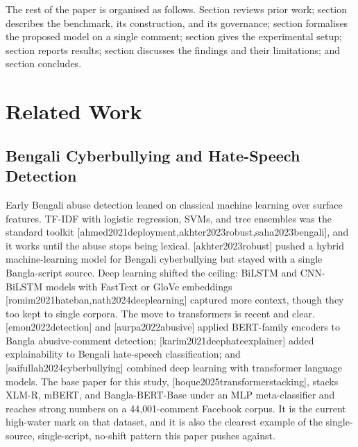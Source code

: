 \documentclass[11pt,a4paper]{article}
\def\citet#1{[#1]}%
\def\citep#1{[#1]}%
\def\Cref#1{Section}%
\def\cref#1{section}%
\begin{document}
The rest of the paper is organised as follows. \Cref{sec:related-work} reviews prior work; \cref{sec:benchmark} describes the benchmark, its construction, and its governance; \cref{sec:methodology} formalises the proposed model on a single comment; \cref{sec:setup} gives the experimental setup; \cref{sec:results} reports results; \cref{sec:discussion} discusses the findings and their limitations; and \cref{sec:conclusion} concludes.

\section{Related Work}
\label{sec:related-work}

\subsection{Bengali Cyberbullying and Hate-Speech Detection}
\label{sec:rw-bengali}

Early Bengali abuse detection leaned on classical machine learning over surface features. TF-IDF with logistic regression, SVMs, and tree ensembles was the standard toolkit \citep{ahmed2021deployment,akhter2023robust,saha2023bengali}, and it works until the abuse stops being lexical. \citet{akhter2023robust} pushed a hybrid machine-learning model for Bengali cyberbullying but stayed with a single Bangla-script source. Deep learning shifted the ceiling: BiLSTM and CNN-BiLSTM models with FastText or GloVe embeddings \citep{romim2021hateban,nath2024deeplearning} captured more context, though they too kept to single corpora. The move to transformers is recent and clear. \citet{emon2022detection} and \citet{aurpa2022abusive} applied BERT-family encoders to Bangla abusive-comment detection; \citet{karim2021deephateexplainer} added explainability to Bengali hate-speech classification; and \citet{saifullah2024cyberbullying} combined deep learning with transformer language models. The base paper for this study, \citet{hoque2025transformerstacking}, stacks XLM-R, mBERT, and Bangla-BERT-Base under an MLP meta-classifier and reaches strong numbers on a 44{,}001-comment Facebook corpus. It is the current high-water mark on that dataset, and it is also the clearest example of the single-source, single-script, no-shift pattern this paper pushes against.
\end{document}
